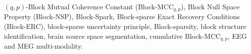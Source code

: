 $({q,p})$-Block Mutual Coherence Constant (Block-MCC$_{q,p}$),
Block Null Space Property (Block-NSP),
Block-Spark,     
Block-sparse Exact Recovery Conditions (Block-ERC), 
block-sparse uncertainty principle,
Block-sparsity,
block structure identification,
brain source space segmentation,
cumulative Block-MCC$_{q,p}$,  
EEG and MEG multi-modality.